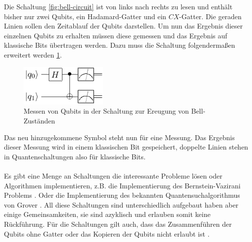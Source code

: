 Die Schaltung \ref{fig:bell-circuit} ist von links nach rechts zu lesen und enth\"alt bisher nur zwei Qubits, ein Hadamard-Gatter und ein $CX$-Gatter. Die geraden Linien sollen den Zeitablauf der Qubits darstellen. Um nun das Ergebnis dieser einzelnen Qubits zu erhalten m\"ussen diese gemessen und das Ergebnis auf klassische Bits \"ubertragen werden. Dazu muss die Schaltung folgenderma\ss en erweitert werden \ref{fig:bell-measured}.
\begin{figure}[h]
  \centering
  \includegraphics[width=0.38\textwidth]{figures/bell-measured.pdf}
  \caption{Messen von Qubits in der Schaltung zur Ereugung von Bell-Zust\"anden}
  \label{fig:bell-measured}
\end{figure}
Das neu hinzugekommene Symbol steht nun f\"ur eine Messung. Das Ergebnis dieser Messung wird in einem klassischen Bit gespeichert, doppelte Linien stehen in Quantenschaltungen also f\"ur klassische Bits.\\\\
Es gibt eine Menge an Schaltungen die interessante Probleme l\"osen oder Algorithmen implementieren, z.B. die Implementierung des Bernstein-Vazirani Problems \cite{Du_2001}. Oder die Implementierung des bekannten Quantensuchalgorithmus von Grover \cite{Figgatt_2017}. All diese Schaltungen sind unterschiedlich aufgebaut haben aber einige Gemeinsamkeiten, sie sind azyklisch und erlauben somit keine R\"uckf\"uhrung. F\"ur die Schaltungen gilt auch, dass das Zusammenf\"uhren der Qubits ohne Gatter oder das Kopieren der Qubits nicht erlaubt ist \cite{nielsen_chuang_2010}.
